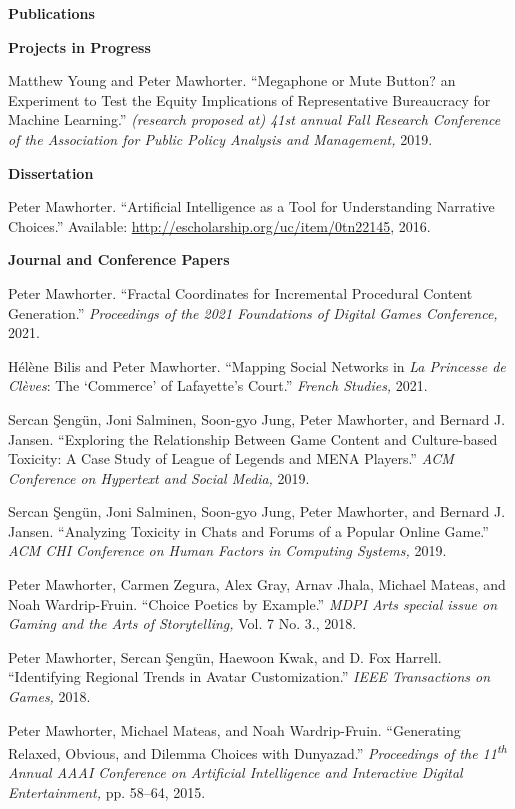 \documentclass[11pt]{article}
\newenvironment{pubs}[1]{%
  \vspace{8pt}\textbf{\Large #1} \hrulefill\vspace{6pt}
  \begin{adjustwidth}{14pt}{0pt}
  \setlength{\parskip}{4pt}
  \setlength{\parindent}{-8pt}
}{%
  \end{adjustwidth}
}
\newcommand{\plainpub}[4]{%
\begin{samepage}
#1. ``#2.'' #3, #4.

\end{samepage}%
}
\newcommand{\fullpub}[5]{%
\begin{samepage}
#1. ``#2.'' \textit{#3,} #4, #5.

\end{samepage}%
}
\newcommand{\nppub}[4]{%
\begin{samepage}
#1. ``#2.'' \textit{#3,} #4.

\end{samepage}%
}
\newcommand{\heading}[1]{\textbf{\large #1}\vspace{4pt}}
\newcommand{\tsup}[1]{\textsuperscript{#1}}
\begin{document}
\begin{pubs}{Publications}

\heading{Projects in Progress}

\nppub{Matthew Young and Peter Mawhorter}{Megaphone or Mute Button? an Experiment to Test the Equity Implications of Representative Bureaucracy for Machine Learning}{(research proposed at) 41st annual Fall Research Conference of the Association for Public Policy Analysis and Management}{2019}

\vspace{6pt}
\heading{Dissertation}

\plainpub{Peter Mawhorter}{Artificial Intelligence as a Tool for Understanding Narrative Choices}{\hfill\break Available: \url{http://escholarship.org/uc/item/0tn22145}}{2016}

\vspace{6pt}
\heading{Journal and Conference Papers}

\nppub{Peter Mawhorter}{Fractal Coordinates for Incremental Procedural Content Generation}{Proceedings of the 2021 Foundations of Digital Games Conference}{2021}

\nppub{Hélène Bilis and Peter Mawhorter}{Mapping Social Networks in \emph{La Princesse de Clèves}: The `Commerce' of Lafayette's Court}{French Studies}{2021}

\nppub{Sercan \c{S}eng\"un, Joni Salminen, Soon-gyo Jung, Peter Mawhorter, and Bernard J. Jansen}{Exploring the Relationship Between Game Content and Culture-based Toxicity: A Case Study of League of Legends and MENA Players}{ACM Conference on Hypertext and Social Media}{2019}

\nppub{Sercan \c{S}eng\"un, Joni Salminen, Soon-gyo Jung, Peter Mawhorter, and Bernard J. Jansen}{Analyzing Toxicity in Chats and Forums of a Popular Online Game}{ACM CHI Conference on Human Factors in Computing Systems}{2019}

\fullpub{Peter Mawhorter, Carmen Zegura, Alex Gray, Arnav Jhala, Michael Mateas, and Noah Wardrip-Fruin}{Choice Poetics by Example}{MDPI Arts special issue on Gaming and the Arts of Storytelling}{Vol. 7 No. 3.}{2018}

\nppub{Peter Mawhorter, Sercan \c{S}eng\"un, Haewoon Kwak, and D. Fox Harrell}{Identifying Regional Trends in Avatar Customization}{IEEE Transactions on Games}{2018}

\fullpub{Peter Mawhorter, Michael Mateas, and Noah Wardrip-Fruin}{Generating Relaxed, Obvious, and Dilemma Choices with Dunyazad}{Proceedings of the 11\tsup{th} Annual AAAI Conference on Artificial Intelligence and Interactive Digital Entertainment}{pp. 58--64}{2015}


\end{pubs}
\end{document}
